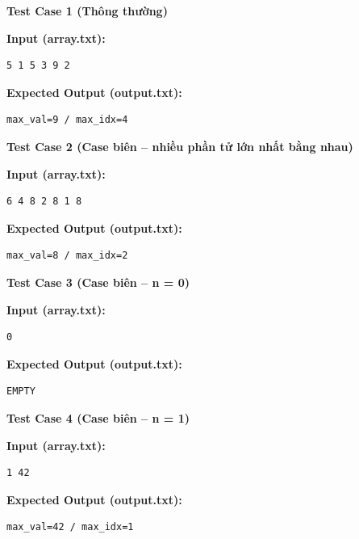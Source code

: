 \textbf{Test Case 1 (Thông thường)}

\textbf{Input (array.txt):}
\begin{lstlisting}
5 1 5 3 9 2
\end{lstlisting}

\textbf{Expected Output (output.txt):}
\begin{lstlisting}
max_val=9 / max_idx=4
\end{lstlisting}

\vspace{0.5cm}

\textbf{Test Case 2 (Case biên -- nhiều phần tử lớn nhất bằng nhau)}

\textbf{Input (array.txt):}
\begin{lstlisting}
6 4 8 2 8 1 8
\end{lstlisting}

\textbf{Expected Output (output.txt):}
\begin{lstlisting}
max_val=8 / max_idx=2
\end{lstlisting}

\vspace{0.5cm}

\textbf{Test Case 3 (Case biên -- n = 0)}

\textbf{Input (array.txt):}
\begin{lstlisting}
0
\end{lstlisting}

\textbf{Expected Output (output.txt):}
\begin{lstlisting}
EMPTY
\end{lstlisting}

\vspace{0.5cm}

\textbf{Test Case 4 (Case biên -- n = 1)}

\textbf{Input (array.txt):}
\begin{lstlisting}
1 42
\end{lstlisting}

\textbf{Expected Output (output.txt):}
\begin{lstlisting}
max_val=42 / max_idx=1
\end{lstlisting}
